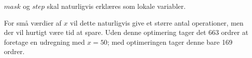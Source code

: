\documentclass[12pt,a4paper]{article}
\begin{document}
$mask$ og $step$ skal naturligvis erklæres som lokale variabler.

For små værdier af $x$ vil dette naturligvis give et større antal operationer,
men der vil hurtigt være tid at spare. Uden denne optimering tager det 663
ordrer at foretage en udregning med $x=50$; med optimeringen tager denne bare
169 ordrer.
%
\end{document}
